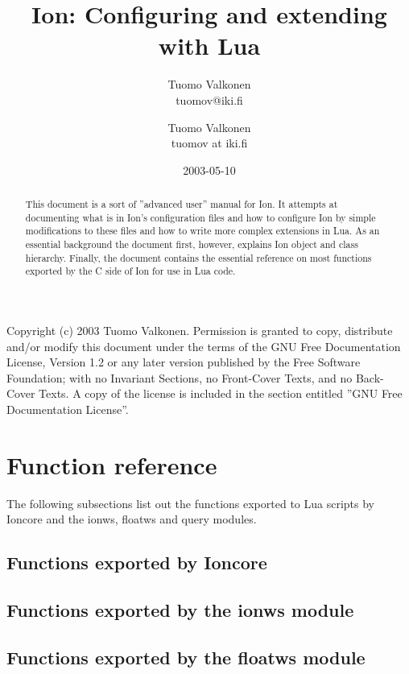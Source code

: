 \documentclass[english,a4paper,11pt,oldtoc,mctitle]{rapport3}
\title{Ion: Configuring and extending with Lua}
\author{Tuomo Valkonen \\ tuomov@iki.fi}
\author{Tuomo Valkonen \\ tuomov at iki.fi}
\date{2003-05-10}
\begin{document}
\maketitle

Copyright (c)  2003 Tuomo Valkonen.
Permission is granted to copy, distribute and/or modify this document
under the terms of the GNU Free Documentation License, Version 1.2
or any later version published by the Free Software Foundation;
with no Invariant Sections, no Front-Cover Texts, and no Back-Cover Texts.
A copy of the license is included in the section entitled ''GNU
Free Documentation License''.

\begin{abstract}
    This document is a sort of ''advanced user'' manual for Ion. It
    attempts at documenting what is in Ion's configuration files and
    how to configure Ion by simple modifications to these files and
    how to write more complex extensions in Lua. As an essential 
    background the document first, however, explains Ion object and
    class hierarchy. Finally, the document contains the essential
    reference on most functions exported by the C side of Ion for use
    in Lua code.
\end{abstract}

\tableofcontents





\chapter{Function reference}
\label{sec:exports}

The following subsections list out the functions exported to Lua scripts
by Ioncore and the ionws, floatws and query modules.

\section{Functions exported by Ioncore}
\label{sec:ioncoreref}



\section{Functions exported by the ionws module}
\label{sec:ionwsref}



\section{Functions exported by the floatws module}
\label{sec:floatwsref}
\end{document}
